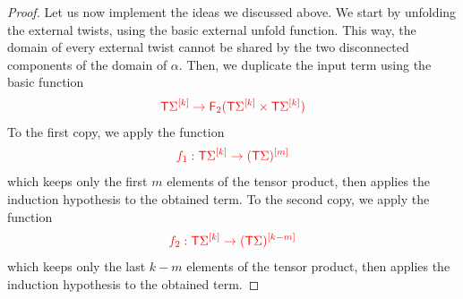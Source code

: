 \begin{proof}
Let us now implement the ideas we discussed above. We start by unfolding the external twists, using the basic external unfold function. This way, the domain of every external twist  cannot be shared by the two disconnected components of the domain of $\alpha$.
Then, we duplicate the input term using the basic function 
\begin{align*}
\ranked{\tmonad \mati k \Sigma\to \reduce 2 (\tmonad \mati k \Sigma\product \tmonad \mati k \Sigma)}
\end{align*}
To the first copy, we apply the function  
\begin{align*}
\ranked{f_1:\tmonad \mati k \Sigma \to \mati m {(\tmonad \Sigma)}}
\end{align*}
which keeps only the first $m$ elements of the tensor product, then applies the induction hypothesis to the obtained term.
To the second copy, we apply the function 
\begin{align*}
\ranked{f_2:\tmonad \mati k \Sigma \to \mati {k-m} {(\tmonad \Sigma)}}
\end{align*}
which keeps only the last $k-m$ elements of the tensor product, then applies the induction hypothesis to the obtained term.


\end{proof}
